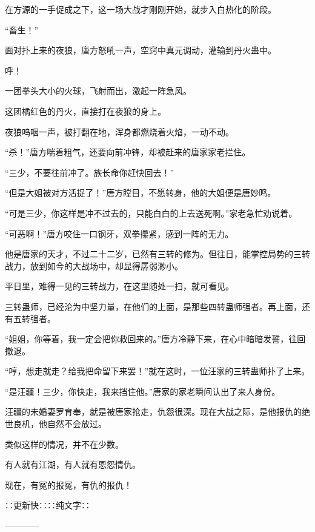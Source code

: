 \begin{this_body}
在方源的一手促成之下，这一场大战才刚刚开始，就步入白热化的阶段。

“畜生！”

面对扑上来的夜狼，唐方怒吼一声，空窍中真元调动，灌输到丹火蛊中。

呼！

一团拳头大小的火球，飞射而出，激起一阵急风。

这团橘红色的丹火，直接打在夜狼的身上。

夜狼呜咽一声，被打翻在地，浑身都燃烧着火焰，一动不动。

“杀！”唐方喘着粗气，还要向前冲锋，却被赶来的唐家家老拦住。

“三少，不要往前冲了。族长命你赶快回去！”

“但是大姐被对方活捉了！”唐方瞠目，不愿转身，他的大姐便是唐妙鸣。

“可是三少，你这样是冲不过去的，只能白白的上去送死啊。”家老急忙劝说着。

“可恶啊！”唐方咬住一口钢牙，双拳攥紧，感到一阵的无力。

他是唐家的天才，不过二十二岁，已然有三转的修为。但往日，能掌控局势的三转战力，放到如今的大战场中，却显得孱弱渺小。

平日里，难得一见的三转战力，在这里随处一扫，就可看见。

三转蛊师，已经沦为中坚力量，在他们的上面，是那些四转蛊师强者。再上面，还有五转强者。

“姐姐，你等着，我一定会把你救回来的。”唐方冷静下来，在心中暗暗发誓，往回撤退。

“哼，想走就走？给我把命留下来罢！”就在这时，一位汪家的三转蛊师扑了上来。

“是汪疆！三少，你快走，我来挡住他。”唐家的家老瞬间认出了来人身份。

汪疆的未婚妻罗育奉，就是被唐家抢走，仇怨很深。现在大战之际，是他报仇的绝世良机，他自然不会放过。

类似这样的情况，并不在少数。

有人就有江湖，有人就有恩怨情仇。

现在，有冤的报冤，有仇的报仇！

∷更新快∷∷纯文字∷

------------

\end{this_body}

